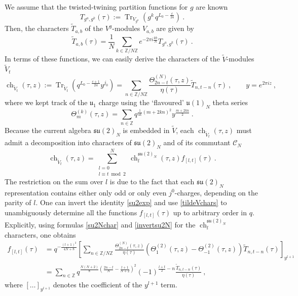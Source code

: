 \documentclass[11pt,reqno]{article}
\newcommand{\be}{\begin{equation}}
\newcommand{\ee}{\end{equation}}
\DeclareMathOperator{\Tr}{Tr}
\newcommand{\ZZ}{\mathbb{Z}}
\newcommand{\alg}[1]{\mathfrak{#1}}
\DeclareMathOperator{\ch}{ch}
\begin{document}
We assume that the twisted-twining partition functions for $g$ are known
\be T_{g^a,g^k}(\tau):=\Tr_{V_{g^a}}(g^k\,q^{L_0-\frac{c}{24}})\ .
\ee Then, the characters $\tilde T_{a,b}$ of the $V^g$-modules $V_{a,b}$ are given by
\be \tilde T_{a,b}(\tau)=\frac{1}{N}\sum_{k\in \ZZ/N\ZZ} e^{-2\pi i\frac{kb}{N}}T_{g^a,g^k}(\tau)\ .
\ee
In terms of these functions, we can easily derive the characters of the $\tilde V$-modules $\tilde V_t$
\be\label{tildeVchars} \ch_{\tilde V_t}(\tau,z):=\Tr_{\tilde V_t}(q^{L_0-\frac{c+1}{24}}y^{j_0})=\sum_{n\in \ZZ/N\ZZ} \frac{\Theta^{(N)}_{2n-t}(\tau,z)}{\eta(\tau)}\tilde T_{n,t-n}(\tau)\ ,\qquad y=e^{2\pi i z}\ ,
\ee 
where we kept track of the $\alg{u}_1$ charge using the `flavoured' $\alg{u}(1)_N$ theta series
\be \Theta_m^{(k)}(\tau,z)=\sum_{n\in \ZZ} q^{\frac{1}{4k}(m+2kn)^2}y^{\frac{m+2kn}{2}}\ .\ee
Because the current algebra $\alg{su}(2)_N$ is embedded in $\tilde V$,  each $\ch_{\tilde V_t}(\tau,z)$ must admit a decomposition into characters of $\alg{su}(2)_N$ and of its commutant $\mathcal{C}_N$
\be\label{su2exp} \ch_{\tilde V_t}(\tau,z)=\sum_{\substack{l=0\\ l\equiv t\bmod{2}}}^N\ch^{\alg{su}(2)_N}_l(\tau,z)f_{[l,t]}(\tau)\ .
\ee The restriction on the sum over $l$ is due to the fact that  each $\alg{su}(2)_N$ representation contains either only odd or only even $j^0$-charges, depending on the parity of $l$. One can invert the identity \eqref{su2exp} and use \eqref{tildeVchars} to unambiguously determine all the functions $f_{[l,t]}(\tau)$ up to arbitrary order in $q$. 
Explicitly, using formulas \eqref{su2Nchar} and \eqref{invertsu2N} for the $\ch^{\alg{su}(2)_N}_l$ characters, one obtains
\begin{align} f_{[l,t]}(\tau)&=q^{-\frac{(l+1)^2}{4N+8}}\left[\sum_{n\in \ZZ/N\ZZ} \frac{\Theta^{(N)}_{2n-t}(\tau,z)}{\eta(\tau)}(\Theta^{(2)}_1(\tau,z)-\Theta^{(2)}_{-1}(\tau,z))\tilde T_{n,t-n}(\tau)\right]_{y^{l+1}}\\
	&=\sum_{n\in \ZZ} q^{\frac{N(N+2)}{8}(\frac{2n-t}{N}-\frac{l+1}{N+2})^2} (-1)^{\frac{l+t}{2}-n}\frac{\tilde T_{n,t-n}(\tau)}{\eta(\tau)}	\ ,
\end{align} where $\left[\ldots\right]_{y^{l+1}}$ denotes the coefficient of the $y^{l+1}$ term.
\end{document}
